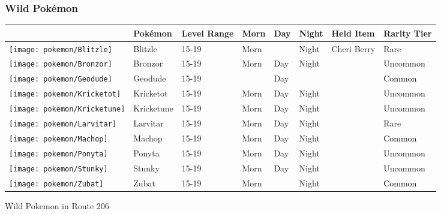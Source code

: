 \subsubsection{Wild Pokémon}%
\label{ssubsec:WildPokmon}%
\begin{longtable}{||l l l l l l l l||}%
\hline%
\rowcolor{GroundColor}%
&Pokémon&Level Range&Morn&Day&Night&Held Item&Rarity Tier\\%
\hline%
\endhead%
\hline%
\rowcolor{GroundColor}%
\texttt{[image: pokemon/Blitzle]}&Blitzle&15{-}19&Morn&&Night&Cheri Berry&\textcolor{RedOrange}{%
Rare%
}\\%
\hline%
\rowcolor{GroundColor}%
\texttt{[image: pokemon/Bronzor]}&Bronzor&15{-}19&Morn&Day&Night&&\textcolor{OliveGreen}{%
Uncommon%
}\\%
\hline%
\rowcolor{GroundColor}%
\texttt{[image: pokemon/Geodude]}&Geodude&15{-}19&&Day&&&\textcolor{black}{%
Common%
}\\%
\hline%
\rowcolor{GroundColor}%
\texttt{[image: pokemon/Kricketot]}&Kricketot&15{-}19&Morn&Day&Night&&\textcolor{OliveGreen}{%
Uncommon%
}\\%
\hline%
\rowcolor{GroundColor}%
\texttt{[image: pokemon/Kricketune]}&Kricketune&15{-}19&Morn&Day&Night&&\textcolor{OliveGreen}{%
Uncommon%
}\\%
\hline%
\rowcolor{GroundColor}%
\texttt{[image: pokemon/Larvitar]}&Larvitar&15{-}19&Morn&Day&Night&&\textcolor{RedOrange}{%
Rare%
}\\%
\hline%
\rowcolor{GroundColor}%
\texttt{[image: pokemon/Machop]}&Machop&15{-}19&Morn&Day&Night&&\textcolor{black}{%
Common%
}\\%
\hline%
\rowcolor{GroundColor}%
\texttt{[image: pokemon/Ponyta]}&Ponyta&15{-}19&Morn&Day&Night&&\textcolor{OliveGreen}{%
Uncommon%
}\\%
\hline%
\rowcolor{GroundColor}%
\texttt{[image: pokemon/Stunky]}&Stunky&15{-}19&Morn&Day&Night&&\textcolor{OliveGreen}{%
Uncommon%
}\\%
\hline%
\rowcolor{GroundColor}%
\texttt{[image: pokemon/Zubat]}&Zubat&15{-}19&Morn&&Night&&\textcolor{black}{%
Common%
}\\%
\hline%
\end{longtable}%
\caption{Wild Pokemon in Route 206}